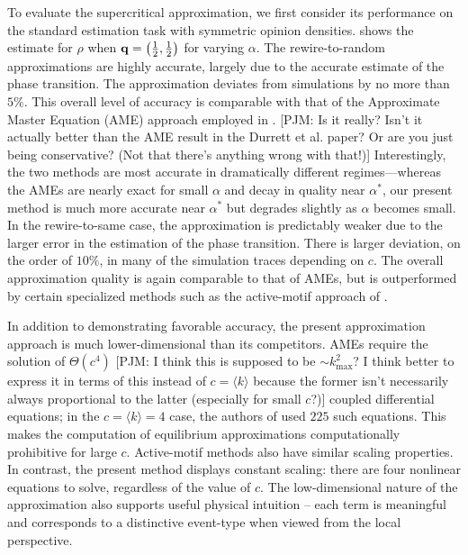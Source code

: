 \documentclass[review, onefignum, onetabnum]{siamart171218}
\newcommand{\pjm}[1]{{\color{blue}[PJM: #1]}}
\begin{document}
		To evaluate the supercritical approximation, we first consider its performance on the standard estimation task with symmetric opinion densities. 
		 shows the estimate for $\rho$ when $\mathbf{q} = \left(\frac{1}{2}, \frac{1}{2}\right)$ for varying $\alpha$. 
		The rewire-to-random approximations are highly accurate, largely due to the accurate estimate of the phase transition. 
		The approximation deviates from simulations by no more than $5\%$. 
		This overall level of accuracy is comparable with that of the  Approximate Master Equation (AME) approach employed in \cite{Durrett2012}. \pjm{Is it really? Isn't it actually better than the AME result in the Durrett et al. paper? Or are you just being conservative? (Not that there's anything wrong with that!)}
		Interestingly, the two methods are most accurate in dramatically different regimes---whereas the AMEs are nearly exact for small $\alpha$ and decay in quality near $\alpha^*$, our present method is much more accurate near $\alpha^*$ but degrades slightly as $\alpha$ becomes small. 
		In the rewire-to-same case, the approximation is predictably weaker due to the larger error in the estimation of the phase transition. 
		There is larger deviation, on the order of $10\%$, in many of the simulation traces depending on $c$. 
		The overall approximation quality is again comparable to that of AMEs, but is outperformed by certain specialized methods such as the active-motif approach of \cite{Demirel2012}. 
		
		In addition to demonstrating favorable accuracy, the present approximation approach is much lower-dimensional than its competitors. 
		AMEs require the solution of $\Theta(c^4)$ \pjm{I think this is supposed to be $\sim k_\mathrm{max}^2$? I think better to express it in terms of this instead of $c=\langle k\rangle$ because the former isn't necessarily always proportional to the latter (especially for small $c$?)} coupled differential equations; in the $c = \langle k\rangle = 4$ case, the authors of \cite{Durrett2012} used $225$ such equations. 
		This makes the computation of equilibrium approximations computationally prohibitive for large $c$. 
		Active-motif methods also have similar scaling properties. 
		In contrast, the present method displays constant scaling: there are four nonlinear equations to solve, regardless of the value of $c$. 
		The low-dimensional nature of the approximation also supports useful physical intuition -- each term is meaningful and corresponds to a distinctive event-type when viewed from the local perspective. 
		
\end{document}
